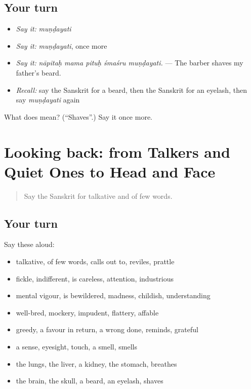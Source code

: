 \subsection*{Your turn}
\begin{itemize}
\raggedright
  \item \emph{Say it:} \emph{muṇḍayati}
  \item \emph{Say it:} \emph{muṇḍayati}, once more
  \item \emph{Say it:} \emph{nāpitaḥ mama pituḥ śmaśru muṇḍayati.} — The barber shaves my father's beard.
  \item \emph{Recall:} say the Sanskrit for a beard, then the Sanskrit for an eyelash, then say \emph{muṇḍayati} again
\end{itemize}

\begin{tcolorbox}[breakable,colback=teal!4,colframe=teal!35!black,title={Before you move on}]
What does  mean? (\textquotedblleft{}Shaves\textquotedblright{}.) Say it once more.
\end{tcolorbox}
\section[(dialogue)]{Looking back: from Talkers and Quiet Ones to Head and Face}

\label{lesson:SA-R471-review-464-471}



\begin{quote}
Say the Sanskrit for talkative and of few words.
\end{quote}

\subsection*{Your turn}
Say these aloud:

\begin{itemize}
\raggedright
  \item talkative, of few words, calls out to, reviles, prattle
  \item fickle, indifferent, is careless, attention, industrious
  \item mental vigour, is bewildered, madness, childish, understanding
  \item well-bred, mockery, impudent, flattery, affable
  \item greedy, a favour in return, a wrong done, reminds, grateful
  \item a sense, eyesight, touch, a smell, smells
  \item the lungs, the liver, a kidney, the stomach, breathes
  \item the brain, the skull, a beard, an eyelash, shaves
\end{itemize}

